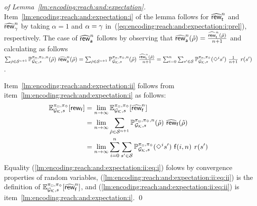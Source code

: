 \begin{proof}[of Lemma~\ref{lm:encoding:reach:and:expectation}]
  Item~\ref{lm:encoding:reach:and:expectation:i} of the lemma follows
  for $\widehat{\mathsf{rew}}_{\mathsf{t}}^n$ and $\widehat{\mathsf{rew}}_{\gamma}^n$ by taking $\alpha=1$
  and $\alpha=\gamma$
  in~(\ref{eq:encoding:reach:and:expectation:i:prel}),  respectively.
  The case of $\widehat{\mathsf{rew}}_{\mathsf{a}}^n$ follows by observing that
  $\widehat{\mathsf{rew}}_{\mathsf{a}}^n(\hat{\rho})=\frac{\widehat{\mathsf{rew}}_{\mathsf{t}}^n(\hat{\rho})}{n+1}$
  and calculating as follows
  $\sum_{\hat{\rho} \in \mathcal{S}^{n+1}} \mathbb{P}^{\pi_{{\Box}},\pi_{{\Diamond}},n}_{{\mathcal{G}_{\mathcal{K}}},s}(\hat{\rho})\ \widehat{\mathsf{rew}}_{\mathsf{a}}^n(\hat{\rho})
  =
  \sum_{\hat{\rho} \in \mathcal{S}^{n+1}} \mathbb{P}^{\pi_{{\Box}},\pi_{{\Diamond}},n}_{{\mathcal{G}_{\mathcal{K}}},s}(\hat{\rho})\ \frac{\widehat{\mathsf{rew}}_{\mathsf{t}}^n(\hat{\rho})}{n+1}
  =
  \sum^{n}_{i=0} \sum_{s' \in \mathcal{S}} \mathbb{P}^{\pi_{{\Box}},\pi_{{\Diamond}}}_{{\mathcal{G}_{\mathcal{K}}},s}(\Diamond^i s')\ \frac{1}{n+1}\ \mathit{r}(s')$.

  
  Item~\ref{lm:encoding:reach:and:expectation:ii} follows from
  item~\ref{lm:encoding:reach:and:expectation:i} as follows:
  \begin{align}
    \mathbb{E}^{\pi_{{\Box}},\pi_{{\Diamond}}}_{{\mathcal{G}_{\mathcal{K}}},s}[\mathsf{rew}_{\mathsf{f}}]
    & =
    \lim_{n\to\infty} \mathbb{E}^{\pi_{{\Box}},\pi_{{\Diamond}}}_{{\mathcal{G}_{\mathcal{K}}},s}[\widehat{\mathsf{rew}}_{\mathsf{f}}^n]
    \label{lm:encoding:reach:and:expectation:ii:eq:i}\\
    & =
    \lim_{n\to\infty} \sum_{\hat{\rho} \in \mathcal{S}^{n+1}} \mathbb{P}^{\pi_{{\Box}},\pi_{{\Diamond}},n}_{{\mathcal{G}_{\mathcal{K}}},s}(\hat{\rho})\ \widehat{\mathsf{rew}}_{\mathsf{f}}(\hat{\rho})
    \label{lm:encoding:reach:and:expectation:ii:eq:ii}\\
    & =
    \lim_{n\to\infty} \sum^{n}_{i=0} \sum_{s' \in \mathcal{S}} \mathbb{P}^{\pi_{{\Box}},\pi_{{\Diamond}}}_{{\mathcal{G}_{\mathcal{K}}},s}(\Diamond^i s')\ \mathsf{f}(i,n)\ \mathit{r}(s')
    \label{lm:encoding:reach:and:expectation:ii:eq:iii}
  \end{align}
  Equality (\ref{lm:encoding:reach:and:expectation:ii:eq:i}) folows by
  convergence properties of random variables,
  (\ref{lm:encoding:reach:and:expectation:ii:eq:ii}) is the definition of
  $\mathbb{E}^{\pi_{{\Box}},\pi_{{\Diamond}}}_{{\mathcal{G}_{\mathcal{K}}},s}[\widehat{\mathsf{rew}}_{\mathsf{f}}^n]$,
  and (\ref{lm:encoding:reach:and:expectation:ii:eq:ii}) is
  item~\ref{lm:encoding:reach:and:expectation:i}.
\qed
\end{proof}


